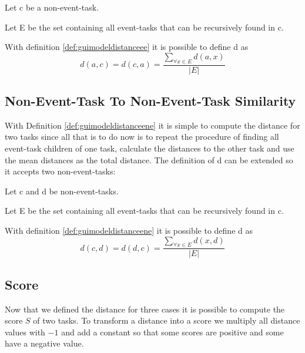 \begin{definition}
	\item Let c be a non-event-task.
	\item Let E be the set containing all event-tasks that can be recursively found in c.
	\item With definition \ref{def:guimodeldistanceee} it is possible to define d as
\begin{equation*}
	d(a,c) = d(c,a) = \frac{\sum_{\forall x \in E} d(a,x)}{|E|}
\end{equation*}
\label{def:guimodeldistanceene}
\end{definition}

\subsection{Non-Event-Task To Non-Event-Task Similarity}
With Definition \ref{def:guimodeldistanceene} it is simple to compute the distance for two tasks since all that is to do now is to repeat the procedure of finding all event-task children of one task, calculate the distances to the other task and use the mean distances as the total distance.
The definition of d can be extended so it accepts two non-event-tasks:

\begin{definition}
	\item Let c and d be non-event-tasks.
	\item Let E be the set containing all event-tasks that can be recursively found in c.
	\item With definition \ref{def:guimodeldistanceene} it is possible to define d as
	\begin{equation*}
		d(c,d) = d(d,c) = \frac{\sum_{\forall x \in E} d(x,d)}{|E|}
	\end{equation*}
\label{def:guimodeldistancenene}
\end{definition}
\subsection{Score}
Now that we defined the distance for three cases it is possible to compute the score $S$ of two tasks.
To transform a distance into a score we multiply all distance values with $-1$ and add a constant so that some scores are positive and some have a negative value.

